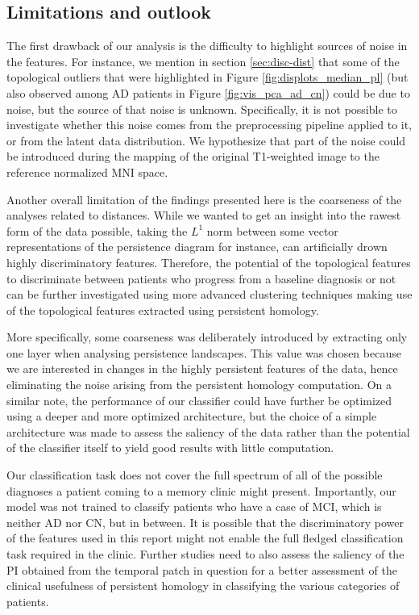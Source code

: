 \documentclass{article}
\begin{document}
\subsection{Limitations and outlook}

The first drawback of our analysis is the difficulty to highlight sources of noise in the features. For instance, we mention in section \ref{sec:disc-dist} that some of the topological outliers that were highlighted in Figure \ref{fig:displots_median_pl} (but also observed among AD patients in Figure \ref{fig:vis_pca_ad_cn}) could be due to noise, but the source of that noise is unknown. Specifically, it is not possible to investigate whether this noise comes from the preprocessing pipeline applied to it, or from the latent data distribution. We hypothesize that part of the noise could be introduced during the mapping of the original T1-weighted image to the reference normalized MNI space.

Another overall limitation of the findings presented here is the coarseness of the analyses related to distances. While we wanted to get an insight into the rawest form of the data possible, taking the $L^1$ norm between some vector representations of the persistence diagram for instance, can artificially drown highly discriminatory features. Therefore, the potential of the topological features to discriminate between patients who progress from a baseline diagnosis or not can be further investigated using more advanced clustering techniques making use of the topological features extracted using persistent homology.

More specifically, some coarseness was deliberately introduced by extracting only one layer when analysing persistence landscapes. This value was chosen because we are interested in changes in the highly persistent features of the data, hence eliminating the noise arising from the persistent homology computation. On a similar note, the performance of our classifier could have further be optimized using a deeper and more optimized architecture, but the choice of a simple architecture was made to assess the saliency of the data rather than the potential of the classifier itself to yield good results with little computation.

Our classification task does not cover the full spectrum of all of the possible diagnoses a patient coming to a memory clinic might present. Importantly, our model was not trained to classify patients who have a case of MCI, which is neither AD nor CN, but in between. It is possible that the discriminatory power of the features used in this report might not enable the full fledged classification task required in the clinic. Further studies need to also assess the saliency of the PI obtained from the temporal patch in question for a better assessment of the clinical usefulness of persistent homology in classifying the various categories of patients.
\end{document}
